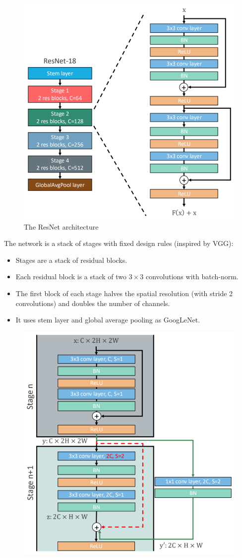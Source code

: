 \documentclass{article}
\begin{document}
\begin{figure}[htbp]
  \centering
  \includegraphics[width=0.8\linewidth]{./img/resnet.png}
  \caption{The ResNet architecture}
\end{figure}

The network is a stack of stages with fixed design rules (inspired by VGG):
\begin{itemize}
  \item Stages are a stack of residual blocks.
  \item Each residual block is a stack of two $3 \times 3$ convolutions with batch-norm.
  \item The first block of each stage halves the spatial resolution (with stride 2 convolutions) and doubles the number of channels.
  \item It uses stem layer and global average pooling as GoogLeNet.
\end{itemize}

\begin{figure}[htbp]
  \centering
  \includegraphics[width=0.8\linewidth]{./img/resnet_skip.png}
\end{figure}
\end{document}
